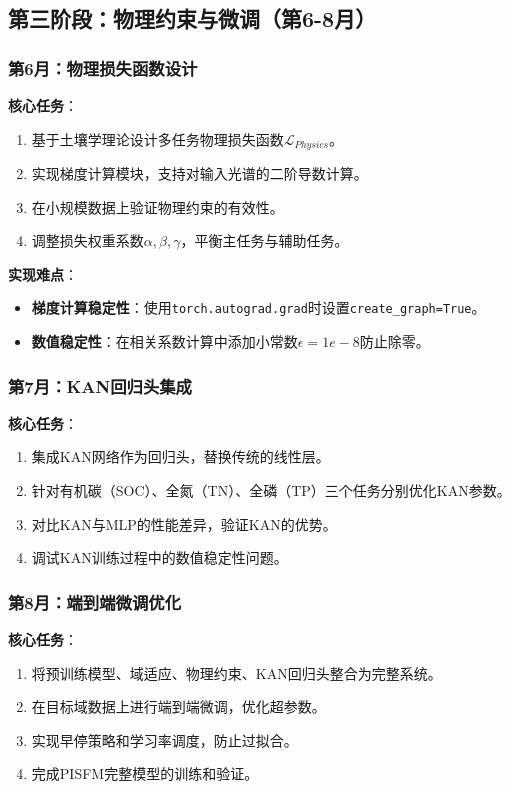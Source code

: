\documentclass[12pt, a4paper]{article}
\begin{document}
\subsection{第三阶段：物理约束与微调（第6-8月）}

\subsubsection{第6月：物理损失函数设计}
\textbf{核心任务}：
\begin{enumerate}
    \item 基于土壤学理论设计多任务物理损失函数$\mathcal{L}_{Physics}$。
    \item 实现梯度计算模块，支持对输入光谱的二阶导数计算。
    \item 在小规模数据上验证物理约束的有效性。
    \item 调整损失权重系数$\alpha, \beta, \gamma$，平衡主任务与辅助任务。
\end{enumerate}

\textbf{实现难点}：
\begin{itemize}
    \item \textbf{梯度计算稳定性}：使用\texttt{torch.autograd.grad}时设置\texttt{create\_graph=True}。
    \item \textbf{数值稳定性}：在相关系数计算中添加小常数$\epsilon=1e-8$防止除零。
\end{itemize}

\subsubsection{第7月：KAN回归头集成}
\textbf{核心任务}：
\begin{enumerate}
    \item 集成KAN网络作为回归头，替换传统的线性层。
    \item 针对有机碳（SOC）、全氮（TN）、全磷（TP）三个任务分别优化KAN参数。
    \item 对比KAN与MLP的性能差异，验证KAN的优势。
    \item 调试KAN训练过程中的数值稳定性问题。
\end{enumerate}

\subsubsection{第8月：端到端微调优化}
\textbf{核心任务}：
\begin{enumerate}
    \item 将预训练模型、域适应、物理约束、KAN回归头整合为完整系统。
    \item 在目标域数据上进行端到端微调，优化超参数。
    \item 实现早停策略和学习率调度，防止过拟合。
    \item 完成PISFM完整模型的训练和验证。
\end{enumerate}
\end{document}
